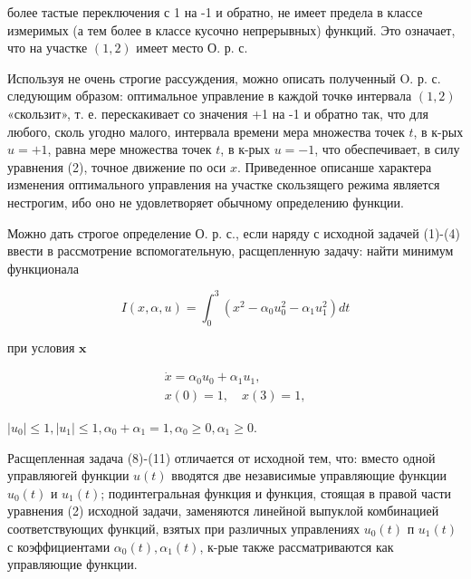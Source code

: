 \documentclass[10pt]{article}
\begin{document}
более тастые переключения с 1 на -1 и обратно, не имеет предела в классе измеримых (а тем более в классе кусочно непрерывных) функций. Это означает, что на участке $(1,2)$ имеет место О. р. с.



Используя не очень строгие рассуждения, можно описать полученный O. р. с. следующим образом: оптимальное управление в каждой точкө интервала $(1,2)$ «скользит», т. е. перескакивает со значения +1 на -1 и обратно так, что для любого, сколь угодно малого, интервала времени мера множества точек $t$, в к-рых $u=+1$, равна мере множества точек $t$, в к-рых $u=-1$, что обеспечивает, в силу уравнения (2), точное движение по оси $x$. Приведенное описанше характера изменения оптимального управления на участке скользящего режима является нестрогим, ибо оно не удовлетворяет обычному определению функции.



Можно дать строгое определение О. р. с., если наряду с исходной задачей (1)-(4) ввести в рассмотрение вспомогательную, расщепленную задачу: найти минимум функционала



\[

I(x, \alpha, u)=\int_{0}^{3}\left(x^{2}-\alpha_{0} u_{0}^{2}-\alpha_{1} u_{1}^{2}\right) d t

\]



при условия $\mathbf{x}$



\[

\begin{gathered}

\dot{x}=\alpha_{0} u_{0}+\alpha_{1} u_{1}, \\

x(0)=1, \quad x(3)=1,

\end{gathered}

\]



$\left|u_{0}\right| \leqslant 1,\left|u_{1}\right| \leqslant 1, \alpha_{0}+\alpha_{1}=1, \alpha_{0} \geqslant 0, \alpha_{1} \geqslant 0$.



Расщепленная задача (8)-(11) отличается от исходной тем, что: вместо одной управляюгей функции $u(t)$ вводятся две независимые управляющие функции $u_{0}(t)$ и $u_{1}(t)$; подинтегральная функция и функция, стоящая в правой части уравнения (2) исходной задачи, заменяются линейной выпуклой комбинацией соответствующих функций, взятых при различных управлениях $u_{0}(t)$ п $u_{1}(t)$ с коэффициентами $\alpha_{0}(t), \alpha_{1}(t)$, к-рые также рассматриваются как управляющие функции.
\end{document}
